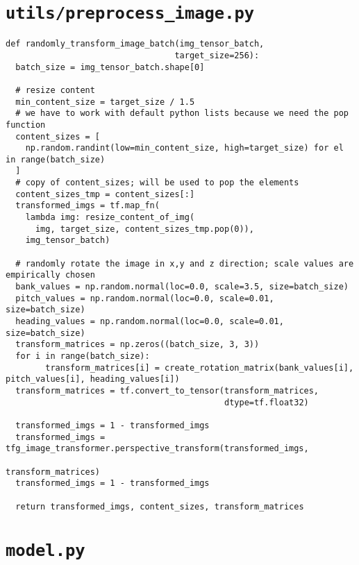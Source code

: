 \section*{\lstinline{utils/preprocess_image.py}}

\begin{code}
  \begin{verbatim}
def randomly_transform_image_batch(img_tensor_batch, 
                                  target_size=256):
  batch_size = img_tensor_batch.shape[0]

  # resize content
  min_content_size = target_size / 1.5
  # we have to work with default python lists because we need the pop function
  content_sizes = [
    np.random.randint(low=min_content_size, high=target_size) for el in range(batch_size)
  ]
  # copy of content_sizes; will be used to pop the elements
  content_sizes_tmp = content_sizes[:]
  transformed_imgs = tf.map_fn(
    lambda img: resize_content_of_img(
      img, target_size, content_sizes_tmp.pop(0)), 
    img_tensor_batch)

  # randomly rotate the image in x,y and z direction; scale values are empirically chosen
  bank_values = np.random.normal(loc=0.0, scale=3.5, size=batch_size)
  pitch_values = np.random.normal(loc=0.0, scale=0.01, size=batch_size)
  heading_values = np.random.normal(loc=0.0, scale=0.01, size=batch_size)
  transform_matrices = np.zeros((batch_size, 3, 3))
  for i in range(batch_size):
        transform_matrices[i] = create_rotation_matrix(bank_values[i], pitch_values[i], heading_values[i])
  transform_matrices = tf.convert_to_tensor(transform_matrices, 
                                            dtype=tf.float32)

  transformed_imgs = 1 - transformed_imgs
  transformed_imgs = tfg_image_transformer.perspective_transform(transformed_imgs,
                                                              transform_matrices)
  transformed_imgs = 1 - transformed_imgs

  return transformed_imgs, content_sizes, transform_matrices
\end{verbatim}
  \label{lst:pictogram-augmentation}
  \end{code}

\section*{\lstinline{model.py}}

